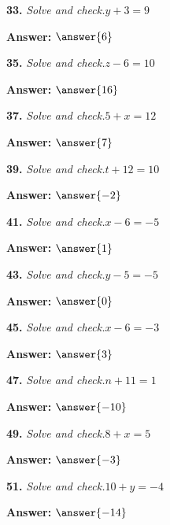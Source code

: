 \documentclass{ximera}
\begin{document}
\begin{problem}
\textbf{33.} \emph{Solve and check.}\quad $y + 3 = 9$

\textbf{Answer:} $\answer{6}$
\end{problem}

\begin{problem}
\textbf{35.} \emph{Solve and check.}\quad $z - 6 = 10$

\textbf{Answer:} $\answer{16}$
\end{problem}

\begin{problem}
\textbf{37.} \emph{Solve and check.}\quad $5 + x = 12$

\textbf{Answer:} $\answer{7}$
\end{problem}

\begin{problem}
\textbf{39.} \emph{Solve and check.}\quad $t + 12 = 10$

\textbf{Answer:} $\answer{-2}$
\end{problem}

\begin{problem}
\textbf{41.} \emph{Solve and check.}\quad $x - 6 = -5$

\textbf{Answer:} $\answer{1}$
\end{problem}

\begin{problem}
\textbf{43.} \emph{Solve and check.}\quad $y - 5 = -5$

\textbf{Answer:} $\answer{0}$
\end{problem}

\begin{problem}
\textbf{45.} \emph{Solve and check.}\quad $x - 6 = -3$

\textbf{Answer:} $\answer{3}$
\end{problem}

\begin{problem}
\textbf{47.} \emph{Solve and check.}\quad $n + 11 = 1$

\textbf{Answer:} $\answer{-10}$
\end{problem}

\begin{problem}
\textbf{49.} \emph{Solve and check.}\quad $8 + x = 5$

\textbf{Answer:} $\answer{-3}$
\end{problem}

\begin{problem}
\textbf{51.} \emph{Solve and check.}\quad $10 + y = -4$

\textbf{Answer:} $\answer{-14}$
\end{problem}
\end{document}

